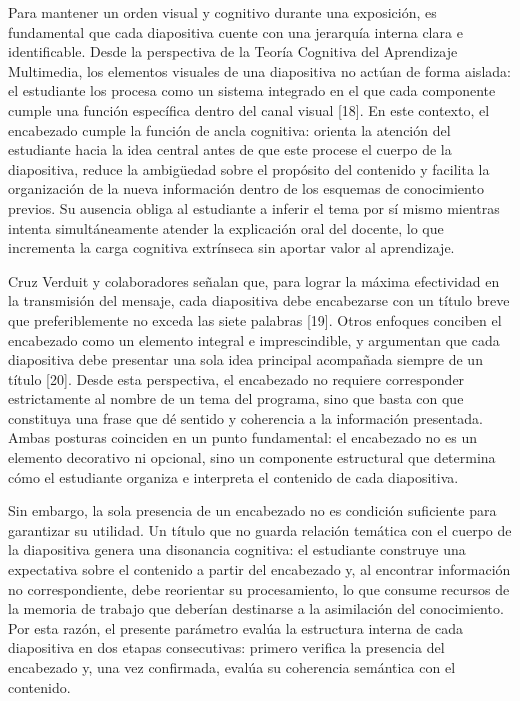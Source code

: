 \documentclass[11pt]{article}
\begin{document}
Para mantener un orden visual y cognitivo durante una exposición, es fundamental que cada diapositiva cuente con una jerarquía interna clara e identificable. Desde la perspectiva de la Teoría Cognitiva del Aprendizaje Multimedia, los elementos visuales de una diapositiva no actúan de forma aislada: el estudiante los procesa como un sistema integrado en el que cada componente cumple una función específica dentro del canal visual [18]. En este contexto, el encabezado cumple la función de ancla cognitiva: orienta la atención del estudiante hacia la idea central antes de que este procese el cuerpo de la diapositiva, reduce la ambigüedad sobre el propósito del contenido y facilita la organización de la nueva información dentro de los esquemas de conocimiento previos. Su ausencia obliga al estudiante a inferir el tema por sí mismo mientras intenta simultáneamente atender la explicación oral del docente, lo que incrementa la carga cognitiva extrínseca sin aportar valor al aprendizaje.

Cruz Verduit y colaboradores señalan que, para lograr la máxima efectividad en la transmisión del mensaje, cada diapositiva debe encabezarse con un título breve que preferiblemente no exceda las siete palabras [19]. Otros enfoques conciben el encabezado como un elemento integral e imprescindible, y argumentan que cada diapositiva debe presentar una sola idea principal acompañada siempre de un título [20]. Desde esta perspectiva, el encabezado no requiere corresponder estrictamente al nombre de un tema del programa, sino que basta con que constituya una frase que dé sentido y coherencia a la información presentada. Ambas posturas coinciden en un punto fundamental: el encabezado no es un elemento decorativo ni opcional, sino un componente estructural que determina cómo el estudiante organiza e interpreta el contenido de cada diapositiva.

Sin embargo, la sola presencia de un encabezado no es condición suficiente para garantizar su utilidad. Un título que no guarda relación temática con el cuerpo de la diapositiva genera una disonancia cognitiva: el estudiante construye una expectativa sobre el contenido a partir del encabezado y, al encontrar información no correspondiente, debe reorientar su procesamiento, lo que consume recursos de la memoria de trabajo que deberían destinarse a la asimilación del conocimiento. Por esta razón, el presente parámetro evalúa la estructura interna de cada diapositiva en dos etapas consecutivas: primero verifica la presencia del encabezado y, una vez confirmada, evalúa su coherencia semántica con el contenido.
\end{document}
